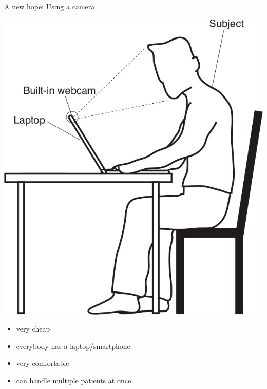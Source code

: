\documentclass{beamer}
\begin{document}
\begin{frame}{A new hope: Using a camera}
	\begin{minipage}{0.3\textwidth}
		\includegraphics[width=\textwidth]{setup_no_bvp.jpg}
	\end{minipage} \pause
	\hfill
	\begin{minipage}{0.5\textwidth}
		\begin{itemize}[label=\positiveaspect]
			\item very cheap \pause
			\item everybody has a laptop/smartphone \pause
			\item very comfortable \pause
			\item can handle multiple patients at once
		\end{itemize}
	\end{minipage}
\end{frame}
\end{document}
